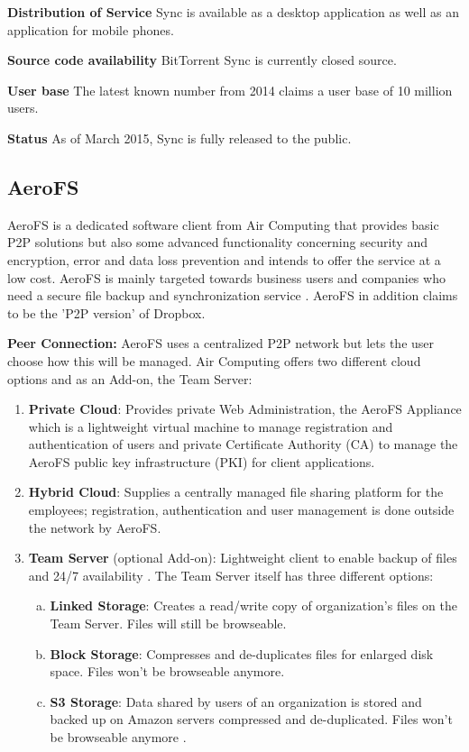 \textbf{Distribution of Service}
Sync is available as a desktop application as well as an application for mobile phones.

\textbf{Source code availability}
BitTorrent Sync is currently closed source.

\textbf{User base}
The latest known number from 2014 claims a user base of 10 million users.

\textbf{Status}
As of March 2015, Sync is fully released to the public.

\subsection{AeroFS}

\label{subsec:Aerofs}
AeroFS is a dedicated software client from Air Computing that provides basic P2P solutions but also some advanced functionality concerning security and encryption, error and data loss prevention and intends to offer the service at a low cost. AeroFS is mainly targeted towards business users and companies who need a secure file backup and synchronization service \cite{aerofs}. AeroFS in addition claims to be the 'P2P version' of Dropbox.

\textbf{Peer Connection:} AeroFS uses a centralized P2P network but lets the user choose how this will be managed. Air Computing offers two different cloud options and as an Add-on, the Team Server:

\begin{enumerate}
\item \textbf{Private Cloud}: Provides private Web Administration, the AeroFS Appliance which is a lightweight virtual machine to manage registration and authentication of users and private Certificate Authority (CA) to manage the AeroFS public key infrastructure (PKI) for client applications.
\item \textbf{Hybrid Cloud}: Supplies a centrally managed file sharing platform for the employees; registration, authentication and user management is done outside the network by AeroFS.
\item \textbf{Team Server} (optional Add-on): Lightweight client to enable backup of files and 24/7 availability \cite{aerofs:cloud_types}. The Team Server itself has three different options:
	\begin{enumerate}[(a)]
	\item \textbf{Linked Storage}: Creates a read/write copy of organization's files on the Team Server. Files will still be browseable.
	\item \textbf{Block Storage}: Compresses and de-duplicates files for enlarged disk space. Files won't be browseable anymore.
	\item \textbf{S3 Storage}: Data shared by users of an organization is stored and backed up on Amazon servers compressed and de-duplicated. Files won't be browseable anymore \cite{aerofs:storage_types}.
	\end{enumerate}
\end{enumerate}

